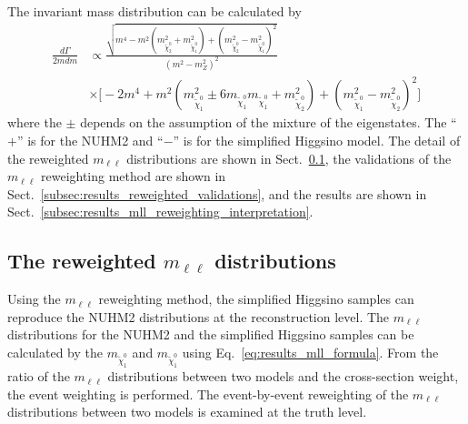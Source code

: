 The invariant mass distribution can be calculated by
%
\begin{align}
    \frac{d\Gamma}{2mdm}
    & \propto \frac{\sqrt{m^{4}-m^{2}(m^{2}_{\widetilde{\chi}^{0}_{2}} + m^{2}_{\widetilde{\chi}^{0}_{1}})+(m^{2}_{\widetilde{\chi}^{0}_{2}} - m^{2}_{\widetilde{\chi}^{0}_{1}})^{2}}}{(m^{2} - m^{2}_{Z})^{2}}\\
    & \times \Big[-2m^{4}+m^{2}(m^{2}_{\widetilde{\chi}^{0}_{1}} \pm 6 m_{\widetilde{\chi}^{0}_{1}} m_{\widetilde{\chi}^{0}_{1}} + m^{2}_{\widetilde{\chi}^{0}_{2}})+(m^{2}_{\widetilde{\chi}^{0}_{1}} - m^{2}_{\widetilde{\chi}^{0}_{2}})^{2}\Big]
    \label{eq:results_mll_formula}
\end{align}
%
where the $\pm$ depends on the assumption of the mixture of the eigenstates.
The ``$+$'' is for the NUHM2 and ``$-$'' is for the simplified Higgsino model.
The detail of the reweighted $m_{\ell \ell}$ distributions are shown in Sect.~\ref{subsec:results_reweighted_mll_distributions}, the validations of the $m_{\ell \ell}$ reweighting method are shown in Sect.~\ref{subsec:results_reweighted_validations}, and the results are shown in Sect.~\ref{subsec:results_mll_reweighting_interpretation}.


\subsection{The reweighted $m_{\ell \ell}$ distributions}
\label{subsec:results_reweighted_mll_distributions}
Using the $m_{\ell \ell}$ reweighting method, the simplified Higgsino samples can reproduce the NUHM2 distributions at the reconstruction level.
The $m_{\ell \ell}$ distributions for the NUHM2 and the simplified Higgsino samples can be calculated by the $m_{\widetilde{\chi}^{0}_{1}}$ and $m_{\widetilde{\chi}^{0}_{1}}$ using Eq.~\ref{eq:results_mll_formula}.
From the ratio of the $m_{\ell \ell}$ distributions between two models and the cross-section weight, the event weighting is performed.
The event-by-event reweighting of the $m_{\ell \ell}$ distributions between two models is examined at the truth level.

